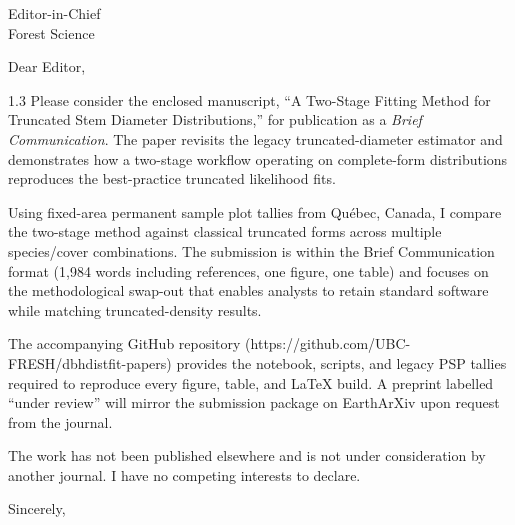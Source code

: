 \documentclass[12pt]{letter}
\begin{document}
\begin{letter}{Editor-in-Chief\\[0.3em]Forest Science}
\opening{Dear Editor,}

\begin{spacing}{1.3}
Please consider the enclosed manuscript, ``A Two-Stage Fitting Method for Truncated Stem Diameter Distributions,'' for publication as a \emph{Brief Communication}. The paper revisits the legacy truncated-diameter estimator and demonstrates how a two-stage workflow operating on complete-form distributions reproduces the best-practice truncated likelihood fits.

Using fixed-area permanent sample plot tallies from Qu\'ebec, Canada, I compare the two-stage method against classical truncated forms across multiple species/cover combinations. The submission is within the Brief Communication format (1,984 words including references, one figure, one table) and focuses on the methodological swap-out that enables analysts to retain standard software while matching truncated-density results.

The accompanying GitHub repository (https://github.com/UBC-FRESH/dbhdistfit-papers) provides the notebook, scripts, and legacy PSP tallies required to reproduce every figure, table, and LaTeX build. A preprint labelled ``under review'' will mirror the submission package on EarthArXiv upon request from the journal.

The work has not been published elsewhere and is not under consideration by another journal. I have no competing interests to declare.
\end{spacing}

\closing{Sincerely,}
\end{letter}
\end{document}

